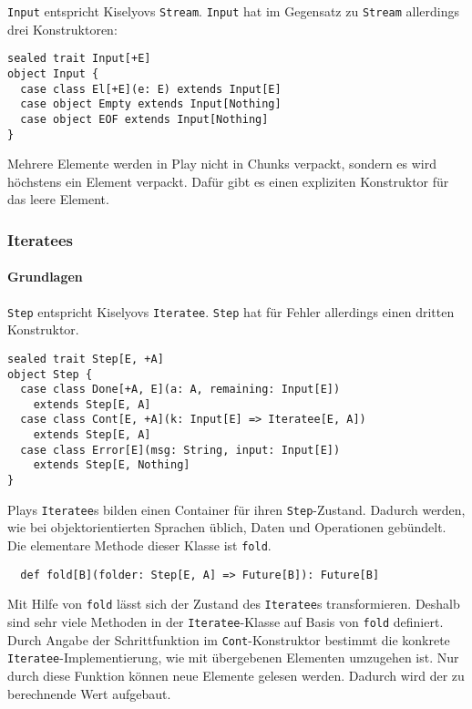 \documentclass[draft=false
              ,paper=a4
              ,twoside=false
              ,fontsize=11pt
              ,headsepline
              ,BCOR10mm
              ,DIV11
              ]{scrbook}
\begin{document}
\lstinline|Input| entspricht Kiselyovs \lstinline|Stream|.
\lstinline|Input| hat im Gegensatz zu \lstinline|Stream| allerdings drei Konstruktoren:
\begin{lstlisting}
sealed trait Input[+E]
object Input {
  case class El[+E](e: E) extends Input[E]
  case object Empty extends Input[Nothing]
  case object EOF extends Input[Nothing]
}
\end{lstlisting}

Mehrere Elemente werden in Play nicht in Chunks verpackt, sondern es wird höchstens ein Element verpackt.
Dafür gibt es einen expliziten Konstruktor für das leere Element.



\subsubsection{Iteratees} %
\label{sssec:iteratees}

\paragraph{Grundlagen} %
\label{par:grundlagen}\mbox{} %

\lstinline|Step| entspricht Kiselyovs \lstinline|Iteratee|.
\lstinline|Step| hat für Fehler allerdings einen dritten Konstruktor.
\begin{lstlisting}
sealed trait Step[E, +A]
object Step {
  case class Done[+A, E](a: A, remaining: Input[E])
    extends Step[E, A]
  case class Cont[E, +A](k: Input[E] => Iteratee[E, A])
    extends Step[E, A]
  case class Error[E](msg: String, input: Input[E])
    extends Step[E, Nothing]
}
\end{lstlisting}

Plays \lstinline|Iteratee|s bilden einen Container für ihren \lstinline|Step|-Zustand.
Dadurch werden, wie bei objektorientierten Sprachen üblich, Daten und Operationen gebündelt.
Die elementare Methode dieser Klasse ist \lstinline|fold|.
\begin{lstlisting}
  def fold[B](folder: Step[E, A] => Future[B]): Future[B]
\end{lstlisting}

Mit Hilfe von \lstinline|fold| lässt sich der Zustand des \lstinline|Iteratee|s transformieren.
Deshalb sind sehr viele Methoden in der \lstinline|Iteratee|-Klasse auf Basis von \lstinline|fold| definiert.
Durch Angabe der Schrittfunktion im \lstinline|Cont|-Konstruktor bestimmt die konkrete \lstinline|Iteratee|-Implementierung, wie mit übergebenen Elementen umzugehen ist.
Nur durch diese Funktion können neue Elemente gelesen werden.
Dadurch wird der zu berechnende Wert aufgebaut.
\end{document}
